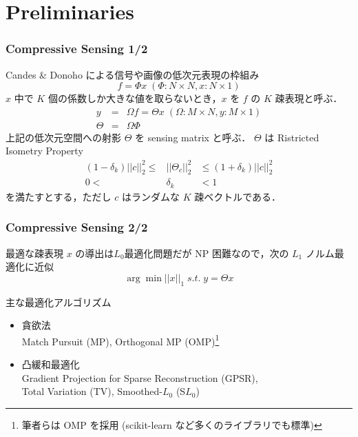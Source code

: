\section{Preliminaries}


\begin{frame}\frametitle{Compressive Sensing 1/2}
Candes \& Donoho による信号や画像の低次元表現の枠組み
\begin{equation}
    f = \Phi x \; (\Phi: N \times N, x: N \times 1)
\end{equation}
$x$ 中で $K$ 個の係数しか大きな値を取らないとき，$x$ を $f$ の $K$ 疎表現と呼ぶ．
\begin{eqnarray}
    y & = & \Omega f = \Theta x \; (\Omega: M \times N, y: M \times 1) \\
    \Theta & = & \Omega \Phi
\end{eqnarray}
上記の低次元空間への射影 $\Theta$ を sensing matrix と呼ぶ．
$\Theta$ は Ristricted Isometry Property
\begin{eqnarray}
    (1 - \delta_k) ||c||^2_2 \leq & || \Theta_c ||^2_2 & \leq (1 + \delta_k) ||c||^2_2 \\
    0 < & \delta_k & < 1
\end{eqnarray}
を満たすとする，ただし $c$ はランダムな $K$ 疎ベクトルである．
\end{frame}


\begin{frame}\frametitle{Compressive Sensing 2/2}
最適な疎表現 $x$ の導出は$L_0$最適化問題だが NP 困難なので，次の $L_1$ ノルム最適化に近似
\begin{equation}
    \arg\min ||x||_1 \; s.t. \; y = \Theta x
\end{equation}
\begin{block}{主な最適化アルゴリズム}
\begin{itemize}
    \item 貪欲法\\
        Match Pursuit (MP),
        Orthogonal MP (OMP)\footnote{筆者らは OMP を採用 (scikit-learn など多くのライブラリでも標準)}

    \item 凸緩和最適化\\
        Gradient Projection for Sparse Reconstruction (GPSR),\\
        Total Variation (TV),
        Smoothed-$L_0$ (S$L_0$)
\end{itemize}
\end{block}
\end{frame}


